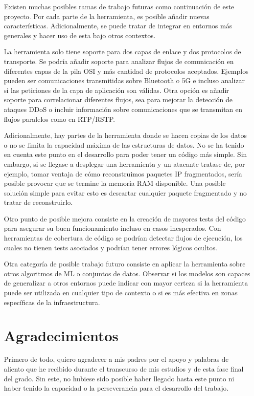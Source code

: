 \documentclass[10pt,a4paper,twoside]{article}
\begin{document}
\begin{multicols*}{2}
    Existen muchas posibles ramas de trabajo futuras como continuación de este proyecto. Por cada parte de la herramienta, es posible añadir nuevas características. Adicionalmente, se puede tratar de integrar en entornos más generales y hacer uso de esta bajo otros contextos.

    La herramienta solo tiene soporte para dos capas de enlace y dos protocolos de transporte. Se podría añadir soporte para analizar flujos de comunicación en diferentes capas de la pila OSI y más cantidad de protocolos aceptados. Ejemplos pueden ser comunicaciones transmitidas sobre Bluetooth o 5G e incluso analizar si las peticiones de la capa de aplicación son válidas. Otra opción es añadir soporte para correlacionar diferentes flujos, sea para mejorar la detección de ataques DDoS o incluir información sobre comunicaciones que se transmitan en flujos paralelos como en RTP/RSTP.

    Adicionalmente, hay partes de la herramienta donde se hacen copias de los datos o no se limita la capacidad máxima de las estructuras de datos. No se ha tenido en cuenta este punto en el desarrollo para poder tener un código más simple. Sin embargo, si se llegase a desplegar una herramienta y un atacante tratase de, por ejemplo, tomar ventaja de cómo reconstruimos paquetes IP fragmentados, sería posible provocar que se termine la memoria RAM disponible. Una posible solución simple para evitar esto es descartar cualquier paquete fragmentado y no tratar de reconstruirlo. 

    Otro punto de posible mejora consiste en la creación de mayores tests del código para asegurar su buen funcionamiento incluso en casos inesperados. Con herramientas de cobertura de código se podrían detectar flujos de ejecución, los cuales no tienen tests asociados y podrían tener errores lógicos ocultos.

    Otra categoría de posible trabajo futuro consiste en aplicar la herramienta sobre otros algoritmos de ML o conjuntos de datos. Observar si los modelos son capaces de generalizar a otros entornos puede indicar con mayor certeza si la herramienta puede ser utilizada en cualquier tipo de contexto o si es más efectiva en zonas específicas de la infraestructura.

    \section{Agradecimientos} \label{agradecimientos}

    Primero de todo, quiero agradecer a mis padres por el apoyo y palabras de aliento que he recibido durante el transcurso de mis estudios y de esta fase final del grado. Sin este, no hubiese sido posible haber llegado hasta este punto ni haber tenido la capacidad o la perseverancia para el desarrollo del trabajo.


\end{multicols*}
\end{document}
